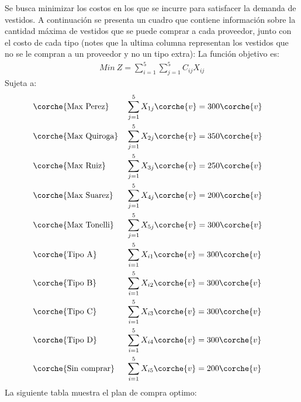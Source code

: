 \begin{homeworkProblem}[-1][Vestidos]
Se busca minimizar los costos en los que se incurre para satisfacer la demanda de vestidos. A continuación se presenta un cuadro que contiene información sobre la cantidad máxima de vestidos que se puede comprar a cada proveedor, junto con el costo de cada tipo (notes que la ultima columna representan los vestidos que no se le compran a un proveedor y no un tipo extra):
La función objetivo es:
\begin{align*}
    Min\ Z = \sum_{i=1}^{5}{\sum_{j=1}^{5}{C_{ij}X_{ij}}}
\end{align*}
Sujeta a:
\begin{align*}
    &\corche{\text{Max Perez}}& &\sum_{j=1}^{5}{X_{1j}}\corche{v} = 300\corche{v}& \\
    &\corche{\text{Max Quiroga}}& &\sum_{j=1}^{5}{X_{2j}}\corche{v} = 350\corche{v}& \\
    &\corche{\text{Max Ruiz}}& &\sum_{j=1}^{5}{X_{3j}}\corche{v} = 250\corche{v}& \\
    &\corche{\text{Max Suarez}}& &\sum_{j=1}^{5}{X_{4j}}\corche{v} = 200\corche{v}& \\
    &\corche{\text{Max Tonelli}}& &\sum_{j=1}^{5}{X_{5j}}\corche{v} = 300\corche{v}& \\
    &\corche{\text{Tipo A}}& &\sum_{i=1}^{5}{X_{i1}}\corche{v} = 300\corche{v}& \\
    &\corche{\text{Tipo B}}& &\sum_{i=1}^{5}{X_{i2}}\corche{v} = 300\corche{v}& \\
    &\corche{\text{Tipo C}}& &\sum_{i=1}^{5}{X_{i3}}\corche{v} = 300\corche{v}& \\
    &\corche{\text{Tipo D}}& &\sum_{i=1}^{5}{X_{i4}}\corche{v} = 300\corche{v}& \\
    &\corche{\text{Sin comprar}}& &\sum_{i=1}^{5}{X_{i5}}\corche{v} = 200\corche{v}& \\
\end{align*}
La siguiente tabla muestra el plan de compra optimo:
\end{homeworkProblem}


